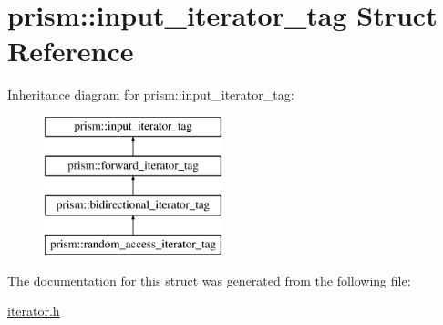 \hypertarget{structprism_1_1input__iterator__tag}{}\section{prism\+:\+:input\+\_\+iterator\+\_\+tag Struct Reference}
\label{structprism_1_1input__iterator__tag}
Inheritance diagram for prism\+:\+:input\+\_\+iterator\+\_\+tag\+:\begin{figure}[H]
\begin{center}
\leavevmode
\includegraphics[height=4.000000cm]{structprism_1_1input__iterator__tag}
\end{center}
\end{figure}


The documentation for this struct was generated from the following file\+:\begin{DoxyCompactItemize}
\item 
\hyperlink{iterator_8h}{iterator.\+h}\end{DoxyCompactItemize}
